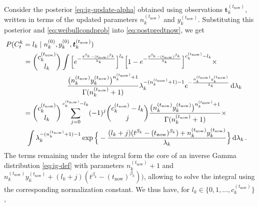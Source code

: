 \documentclass[authoryear]{elsarticle}
\newcommand{\dd}{\,\mathrm{d}}
\renewcommand{\vec}[1]{{\bm#1}}
\newcommand{\uz}{^{(0)}} %
\def\ykz{y\uz_k}
\def\nkz{n\uz_k}
\def\yknow{y_k^{(\tnow)}}
\def\nknow{n_k^{(\tnow)}}
\def\tnow{t_\text{now}}
\def\cknow{c_k^{(\tnow)}}
\def\vectknow{\vec{t}_k^{(\tnow)}}
\begin{document}
Consider the posterior \eqref{eq:ig-update-alpha} obtained using observations $\vectknow$,
written in terms of the updated parameters $\nknow$ and $\yknow$.
Substituting this posterior and \eqref{eq:weibullcondprob} into \eqref{eq:postpredtnow}, we get
\begin{align}
\lefteqn{P(C^k_t = l_k\mid\nkz,\ykz, \vectknow)}\hspace*{5.75ex} \nonumber\\
 &= { \cknow \choose l_k} \int \Big[    e^{-\frac{t^{\beta_k} - (\tnow)^{\beta_k}}{\lambda_k}}\Big]^{l_k}
                               \Big[1 - e^{-\frac{t^{\beta_k} - (\tnow)^{\beta_k}}{\lambda_k}}\Big]^{\cknow - l_k}
    \times \nonumber\\ & \hspace*{14.5ex}
    \frac{\big(\nknow\yknow\big)^{\nknow + 1}}{\Gamma(\nknow + 1)}
    \lambda_k^{-(\nknow + 1) - 1} e^{-\frac{\nknow\yknow}{\lambda_k}} \dd \lambda_k \nonumber\\
 &= { \cknow \choose l_k} \sum_{j=0}^{\cknow - l_k} (-1)^j { \cknow - l_k \choose j}
    \frac{\big(\nknow\yknow\big)^{\nknow + 1}}{\Gamma(\nknow + 1)} 
    \times \nonumber\\ & \hspace*{1ex}
    \int \lambda_k^{-(\nknow + 1) - 1}
    \exp\Big\{-\frac{(l_k + j) (t^{\beta_k} - (\tnow)^{\beta_k}) + \nknow\yknow}{\lambda_k}\Big\} \dd \lambda_k\,.
\end{align}
The terms remaining under the integral form the core of an inverse Gamma distribution \eqref{eq:ig-def}
with parameters $\nknow + 1$ and $\nknow\yknow + (l_k + j) (t^{\beta_k} - (\tnow)^{\beta_k}))$,
allowing to solve the integral using the corresponding normalization constant.
We thus have, for $l_k \in \{0,1,\ldots,\cknow\}$,
\end{document}
